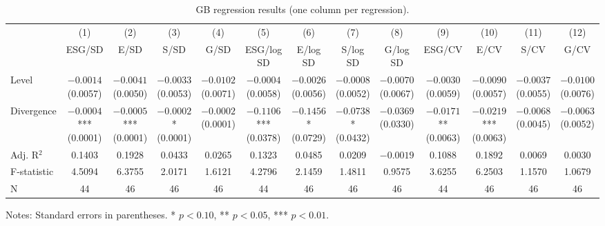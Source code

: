 \begin{table}[htbp]
\centering
\caption{GB regression results (one column per regression).}
\label{tab:gb_reg}
\begin{tabular}{lcccccccccccc}
\toprule
 & (1) & (2) & (3) & (4) & (5) & (6) & (7) & (8) & (9) & (10) & (11) & (12) \\
 & ESG/SD & E/SD & S/SD & G/SD & ESG/log SD & E/log SD & S/log SD & G/log SD & ESG/CV & E/CV & S/CV & G/CV \\
\midrule
Level & $-0.0014$ (0.0057) & $-0.0041$ (0.0050) & $-0.0033$ (0.0053) & $-0.0102$ (0.0071) & $-0.0004$ (0.0058) & $-0.0026$ (0.0056) & $-0.0008$ (0.0052) & $-0.0070$ (0.0067) & $-0.0030$ (0.0059) & $-0.0090$ (0.0057) & $-0.0037$ (0.0055) & $-0.0100$ (0.0076) \\
Divergence & $-0.0004$*** (0.0001) & $-0.0005$*** (0.0001) & $-0.0002$* (0.0001) & $-0.0002$ (0.0001) & $-0.1106$*** (0.0378) & $-0.1456$* (0.0729) & $-0.0738$* (0.0432) & $-0.0369$ (0.0330) & $-0.0171$** (0.0063) & $-0.0219$*** (0.0063) & $-0.0068$ (0.0045) & $-0.0063$ (0.0052) \\
Adj. R$^2$ & 0.1403 & 0.1928 & 0.0433 & 0.0265 & 0.1323 & 0.0485 & 0.0209 & $-0.0019$ & 0.1088 & 0.1892 & 0.0069 & 0.0030 \\
F-statistic & 4.5094 & 6.3755 & 2.0171 & 1.6121 & 4.2796 & 2.1459 & 1.4811 & 0.9575 & 3.6255 & 6.2503 & 1.1570 & 1.0679 \\
N & 44 & 46 & 46 & 46 & 44 & 46 & 46 & 46 & 44 & 46 & 46 & 46 \\
\bottomrule
\end{tabular}
\medskip
\footnotesize Notes: Standard errors in parentheses. * $p<0.10$, ** $p<0.05$, *** $p<0.01$.
\end{table}

